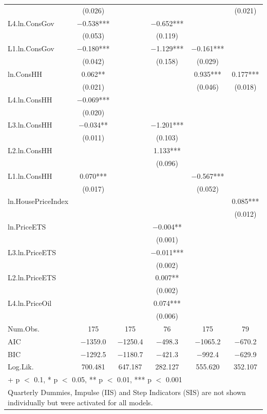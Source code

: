 \begin{table}
{\begin{tabular}[t]{lccccc}
 & (\num{0.026}) &  &  &  & (\num{0.021})\\
L4.ln.ConsGov & \num{-0.538}*** &  & \num{-0.652}*** &  & \\
 & (\num{0.053}) &  & (\num{0.119}) &  & \\
L1.ln.ConsGov & \num{-0.180}*** &  & \num{-1.129}*** & \num{-0.161}*** & \\
 & (\num{0.042}) &  & (\num{0.158}) & (\num{0.029}) & \\
ln.ConsHH & \num{0.062}** &  &  & \num{0.935}*** & \num{0.177}***\\
 & (\num{0.021}) &  &  & (\num{0.046}) & (\num{0.018})\\
L4.ln.ConsHH & \num{-0.069}*** &  &  &  & \\
 & (\num{0.020}) &  &  &  & \\
L3.ln.ConsHH & \num{-0.034}** &  & \num{-1.201}*** &  & \\
 & (\num{0.011}) &  & (\num{0.103}) &  & \\
L2.ln.ConsHH &  &  & \num{1.133}*** &  & \\
 &  &  & (\num{0.096}) &  & \\
L1.ln.ConsHH & \num{0.070}*** &  &  & \num{-0.567}*** & \\
 & (\num{0.017}) &  &  & (\num{0.052}) & \\
ln.HousePriceIndex &  &  &  &  & \num{0.085}***\\
 &  &  &  &  & (\num{0.012})\\
ln.PriceETS &  &  & \num{-0.004}** &  & \\
 &  &  & (\num{0.001}) &  & \\
L3.ln.PriceETS &  &  & \num{-0.011}*** &  & \\
 &  &  & (\num{0.002}) &  \vphantom{1} & \\
L2.ln.PriceETS &  &  & \num{0.007}** &  & \\
 &  &  & (\num{0.002}) &  & \\
L4.ln.PriceOil &  &  & \num{0.074}*** &  & \\
 &  &  & (\num{0.006}) &  & \\
\midrule
Num.Obs. & \num{175} & \num{175} & \num{76} & \num{175} & \num{79}\\
AIC & \num{-1359.0} & \num{-1250.4} & \num{-498.3} & \num{-1065.2} & \num{-670.2}\\
BIC & \num{-1292.5} & \num{-1180.7} & \num{-421.3} & \num{-992.4} & \num{-629.9}\\
Log.Lik. & \num{700.481} & \num{647.187} & \num{282.127} & \num{555.620} & \num{352.107}\\
\bottomrule
\multicolumn{6}{l}{\rule{0pt}{1em}+ p $<$ 0.1, * p $<$ 0.05, ** p $<$ 0.01, *** p $<$ 0.001}\\
\multicolumn{6}{l}{\rule{0pt}{1em}Quarterly Dummies, Impulse (IIS) and Step Indicators (SIS) are not shown individually but were activated for all models.}\\
\end{tabular}}
\end{table}
